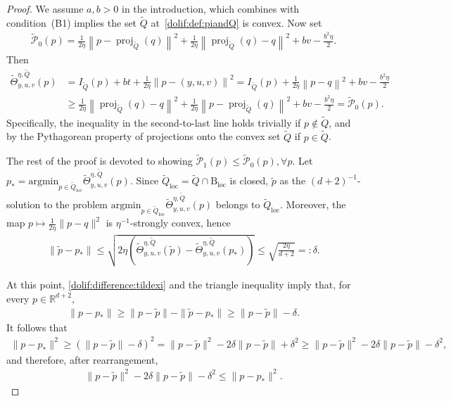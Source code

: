 \documentclass[11pt,letterpaper]{article}
\newcommand{\ball}{\mathrm{B}}
\newcommand{\norm}[1]{\left\lVert #1 \right\rVert}
\newcommand{\local}{\mathrm{loc}}
\newcommand{\Q}{\widetilde{Q}}
\newcommand{\proj}{\operatorname{proj}}
\newcommand{\argmin}{\mathrm{argmin}  }
\newcommand{\nn}{\nonumber}
\begin{document}
\begin{proof}  
We assume $a,b> 0$ in the introduction, which combines with  condition~(B1) implies the set $\Q$ at~\eqref{dolif:def:piandQ} is convex. Now set
\begin{align*}
    \widetilde{\mathcal{P}}_0( p) = \frac{1}{2\eta}\norm{ p - \proj_{\Q}( q)}^2 + \frac{1}{2\eta}\norm{\proj_{\Q}( q) -  q}^2 + bv - \frac{b^2\eta}{2}. 
\end{align*}
Then
    \begin{align}
    \label{dolif:eq:Thetarewrite}
        \widetilde{\Theta}^{\eta,\Q}_{y,u,v}( p) &= I_{\Q}( p) + bt + \frac{1}{2\eta}\norm{ p - (y,u,v)}^2 = I_{\Q}( p) + \frac{1}{2\eta}\norm{ p -  q}^2 + bv - \frac{b^2\eta}{2} \nn\\
        &\ge \frac{1}{2\eta}\norm{\proj_{\Q}( q) -  q}^2 + \frac{1}{2\eta}\norm{ p - \proj_{\Q}( q)}^2 + bv - \frac{b^2\eta}{2} = \widetilde{\mathcal{P}}_0( p).
    \end{align}
Specifically, the inequality in the second-to-last line holds trivially if $ p \notin \Q$, and by the Pythagorean property of projections onto the convex set $\Q$ if $ p \in \Q$.


The rest of the proof is devoted to showing  $\widetilde{\mathcal{P}}_1( p)\le \widetilde{\mathcal{P}}_0( p),\forall p$.  Let $  p_* = \argmin_{ p\in \Q_\local} \widetilde{\Theta}^{\eta,\Q}_{y,u,v}( p)$. Since $\Q_\local=\Q\cap \ball_\local$ is closed, $\tilde{ p}$ as the $(d+2)^{-1}$-solution to the problem
$\argmin_{ p\in \Q_\local}\widetilde{\Theta}^{\eta,\Q}_{y,u,v}( p)$ belongs to $\Q_\local$. Moreover, the map $ p\mapsto \frac{1}{2\eta}\| p- q\|^2$ is $\eta^{-1}$-strongly convex, hence
\begin{align}
\label{dolif:difference:tildexi}
\|\tilde{ p}- p_*\|
\le \sqrt{2\eta\left(\widetilde{\Theta}^{\eta,\Q}_{y,u,v}(\tilde{ p})-\widetilde{\Theta}^{\eta,\Q}_{y,u,v}( p_*)\right)}
\le \sqrt{\frac{2\eta}{d+2}}
=: \delta.
\end{align}

At this point, \eqref{dolif:difference:tildexi} and the triangle inequality imply that, for every $ p\in\mathbb{R}^{d+2}$,
\begin{align}
\label{dolif:estimatewihoutsquare-xi}
\| p- p_*\|
\ge \| p-\tilde{ p}\|-\|\tilde{ p}- p_*\|
\ge \| p-\tilde{ p}\|-\delta.
\end{align}
It follows that
\begin{align*}
\| p- p_*\|^2
\ge \left(\| p-\tilde{ p}\|-\delta\right)^2
= \| p-\tilde{ p}\|^2-2\delta\| p-\tilde{ p}\|+\delta^2
\ge \| p-\tilde{ p}\|^2-2\delta\| p-\tilde{ p}\|-\delta^2,
\end{align*}
and therefore, after rearrangement,
\begin{align}
\label{dolif:firstestimate-composite}
\| p-\tilde{ p}\|^2-2\delta\| p-\tilde{ p}\|-\delta^2
\le \| p- p_*\|^2.
\end{align}


\end{proof}
\end{document}

